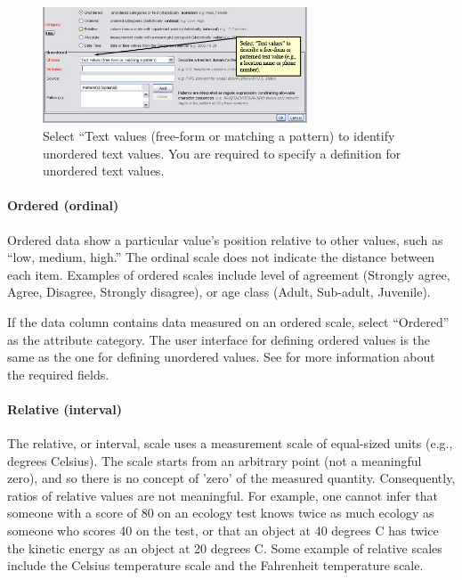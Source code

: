 \begin{figure}
  \centering
    \includegraphics[width=0.7\textwidth]{images/wizard-table-attribute-text-values.jpg}
  \caption{Select ``Text values (free-form or matching a pattern) to
    identify unordered text values. You are required to specify a
    definition for unordered text values.}
  \label{fig:wizard-table-attribute-text-values}
\end{figure}

\paragraph{Ordered (ordinal)} \label{par:cat-ordered}

Ordered data show a particular value's position relative to other
values, such as ``low, medium, high.'' The ordinal scale does not
indicate the distance between each item. Examples of ordered scales
include level of agreement (Strongly agree, Agree, Disagree, Strongly
disagree), or age class (Adult, Sub-adult, Juvenile).

If the data column contains data measured on an ordered scale, select
``Ordered'' as the attribute category. The user interface for defining
ordered values is the same as the one for defining unordered values. See
 for more information about the required
fields.

\paragraph{Relative (interval)} \label{par:cat-relative}

The relative, or interval, scale uses a measurement scale of equal-sized
units (e.g., degrees Celsius). The scale starts from an arbitrary point
(not a meaningful zero), and so there is no concept of 'zero' of the
measured quantity. Consequently, ratios of relative values are not
meaningful. For example, one cannot infer that someone with a score of
80 on an ecology test knows twice as much ecology as someone who scores
40 on the test, or that an object at 40 degrees C has twice the kinetic
energy as an object at 20 degrees C. Some example of relative scales
include the Celsius temperature scale and the Fahrenheit temperature
scale.

